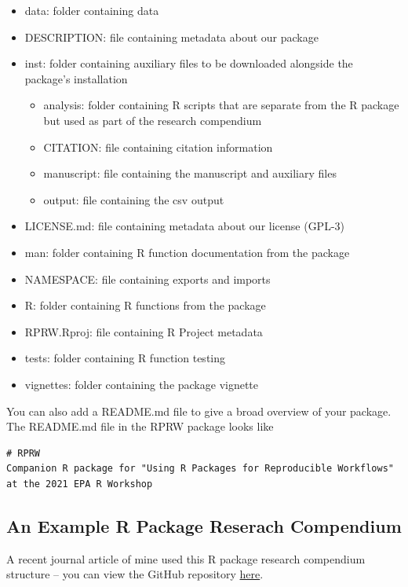 \documentclass[
]{book}
\providecommand{\tightlist}{%
  \setlength{\itemsep}{0pt}\setlength{\parskip}{0pt}}
\begin{document}
\begin{itemize}
\tightlist
\item
  data: folder containing data
\item
  DESCRIPTION: file containing metadata about our package
\item
  inst: folder containing auxiliary files to be downloaded alongside the package's installation

  \begin{itemize}
  \tightlist
  \item
    analysis: folder containing R scripts that are separate from the R package but used as part of the research compendium
  \item
    CITATION: file containing citation information
  \item
    manuscript: file containing the manuscript and auxiliary files
  \item
    output: file containing the csv output
  \end{itemize}
\item
  LICENSE.md: file containing metadata about our license (GPL-3)
\item
  man: folder containing R function documentation from the package
\item
  NAMESPACE: file containing exports and imports
\item
  R: folder containing R functions from the package
\item
  RPRW.Rproj: file containing R Project metadata
\item
  tests: folder containing R function testing
\item
  vignettes: folder containing the package vignette
\end{itemize}

You can also add a README.md file to give a broad overview of your package. The README.md file in the RPRW package looks like

\begin{verbatim}
# RPRW
Companion R package for "Using R Packages for Reproducible Workflows" at the 2021 EPA R Workshop
\end{verbatim}

\hypertarget{ex-rc}{%
\subsection{An Example R Package Reserach Compendium}\label{ex-rc}}

A recent journal article of mine used this R package research compendium structure -- you can view the GitHub repository \href{https://github.com/michaeldumelle/DumelleEtAl2021STLMM}{here}.
\end{document}
